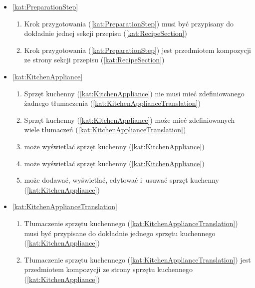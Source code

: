 \begin{itemize}[label={\textbf{Reguły dla}}, wide, labelwidth=!, labelindent=0pt]
\begin{enumerate}[label={\textbf{REG/2/\protect\twodigits{\arabic{enumi}}}}, wide, labelwidth=!, align=left, leftmargin=3cm, resume]
    \end{enumerate}
    \item\ref{kat:PreparationStep}\mynobreakpar
    \begin{enumerate}[label={\textbf{REG/2/\protect\twodigits{\arabic{enumi}}}}, wide, labelwidth=!, align=left, leftmargin=3cm, resume]
        \item Krok przygotowania (\ref{kat:PreparationStep}) musi być przypisany do dokładnie jednej sekcji przepisu (\ref{kat:RecipeSection})
        \item Krok przygotowania (\ref{kat:PreparationStep}) jest przedmiotem kompozycji ze strony sekcji przepisu (\ref{kat:RecipeSection})
    \end{enumerate}
    \item\ref{kat:KitchenAppliance}\mynobreakpar
    \begin{enumerate}[label={\textbf{REG/2/\protect\twodigits{\arabic{enumi}}}}, wide, labelwidth=!, align=left, leftmargin=3cm, resume]
        \item Sprzęt kuchenny (\ref{kat:KitchenAppliance}) nie musi mieć zdefiniowanego żadnego tłumaczenia (\ref{kat:KitchenApplianceTranslation})
        \item Sprzęt kuchenny (\ref{kat:KitchenAppliance}) może mieć zdefiniowanych wiele tłumaczeń (\ref{kat:KitchenApplianceTranslation})
        \item {} może wyświetlać sprzęt kuchenny (\ref{kat:KitchenAppliance})
        \item {} może wyświetlać sprzęt kuchenny (\ref{kat:KitchenAppliance})
        \item {} może dodawać, wyświetlać, edytować i~usuwać sprzęt kuchenny (\ref{kat:KitchenAppliance})
    \end{enumerate}
    \item\ref{kat:KitchenApplianceTranslation}\mynobreakpar
    \begin{enumerate}[label={\textbf{REG/2/\protect\twodigits{\arabic{enumi}}}}, wide, labelwidth=!, align=left, leftmargin=3cm, resume]
        \item Tłumaczenie sprzętu kuchennego (\ref{kat:KitchenApplianceTranslation}) musi być przypisane do dokładnie jednego sprzętu kuchennego (\ref{kat:KitchenAppliance})
        \item Tłumaczenie sprzętu kuchennego (\ref{kat:KitchenApplianceTranslation}) jest przedmiotem kompozycji ze strony sprzętu kuchennego (\ref{kat:KitchenAppliance})

\end{enumerate}
\end{itemize}
